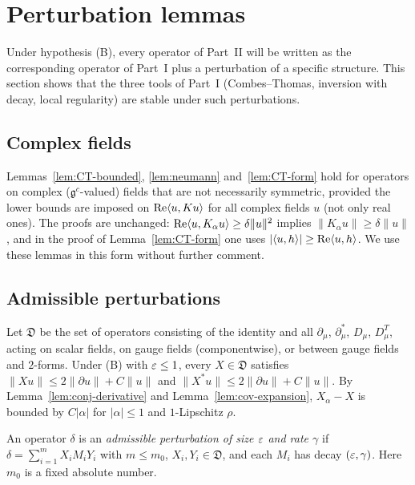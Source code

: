 \section{Perturbation lemmas}\label{sec:perturbation}

Under hypothesis (B), every operator of Part~II will be written as the corresponding operator of Part~I plus a perturbation of a specific structure. This section shows that the three tools of Part~I (Combes--Thomas, inversion with decay, local regularity) are stable under such perturbations.

\subsection{Complex fields}\label{ss:13.1}

Lemmas~\ref{lem:CT-bounded}, \ref{lem:neumann} and~\ref{lem:CT-form} hold for operators on complex ($\mathfrak g^c$-valued) fields that are not necessarily symmetric, provided the lower bounds are imposed on $\operatorname{Re}\langle u,Ku\rangle$ for all complex fields $u$ (not only real ones). The proofs are unchanged: $\operatorname{Re}\langle u,K_\alpha u\rangle\ge\delta\|u\|^2$ implies $\|K_\alpha u\|\ge\delta\|u\|$, and in the proof of Lemma~\ref{lem:CT-form} one uses $|\langle u,h\rangle|\ge\operatorname{Re}\langle u,h\rangle$. We use these lemmas in this form without further comment.

\subsection{Admissible perturbations}\label{ss:13.2}

Let $\mathfrak D$ be the set of operators consisting of the identity and all $\partial_\mu$, $\partial^*_\mu$, $D_\mu$, $D^T_\mu$, acting on scalar fields, on gauge fields (componentwise), or between gauge fields and $2$-forms. Under (B) with $\varepsilon\le1$, every $X\in\mathfrak D$ satisfies $\|Xu\|\le2\|\partial u\|+C\|u\|$ and $\|X^*u\|\le2\|\partial u\|+C\|u\|$. By Lemma~\ref{lem:conj-derivative} and Lemma~\ref{lem:cov-expansion}, $X_\alpha-X$ is bounded by $C|\alpha|$ for $|\alpha|\le1$ and $1$-Lipschitz $\rho$.

\begin{definition}\label{def:admissible}
An operator $\delta$ is an \emph{admissible perturbation of size $\varepsilon$ and rate $\gamma$} if $\delta=\sum_{i=1}^mX_iM_iY_i$ with $m\le m_0$, $X_i,Y_i\in\mathfrak D$, and each $M_i$ has decay $(\varepsilon,\gamma)$. Here $m_0$ is a fixed absolute number.
\end{definition}

